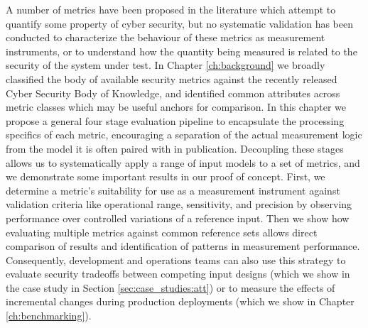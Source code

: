 A number of metrics have been proposed in the literature which attempt to quantify some property of cyber security, but no systematic validation has been conducted to characterize the behaviour of these metrics as measurement instruments, or to understand how the quantity being measured is related to the security of the system under test. In Chapter \ref{ch:background} we broadly classified the body of available security metrics against the recently released Cyber Security Body of Knowledge, and identified common attributes across metric classes which may be useful anchors for comparison. In this chapter we propose a general four stage evaluation pipeline to encapsulate the processing specifics of each metric, encouraging a separation of the actual measurement logic from the model it is often paired with in publication. Decoupling these stages allows us to systematically apply a range of input models to a set of metrics, and we demonstrate some important results in our proof of concept. First, we determine a metric's suitability for use as a measurement instrument against validation criteria like operational range, sensitivity, and precision by observing performance over controlled variations of a reference input. Then we show how evaluating multiple metrics against common reference sets allows direct comparison of results and identification of patterns in measurement performance. Consequently, development and operations teams can also use this strategy to evaluate security tradeoffs between competing input designs (which we show in the case study in Section \ref{sec:case_studies:att}) or to measure the effects of incremental changes during production deployments (which we show in Chapter \ref{ch:benchmarking}). 



